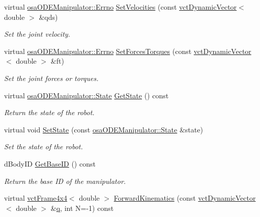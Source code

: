 \begin{DoxyCompactItemize}
virtual \hyperlink{classrob_manipulator_a7bbb51cdb81c9c681075a9274ca0cdc0}{osa\+O\+D\+E\+Manipulator\+::\+Errno} \hyperlink{classosa_o_d_e_manipulator_a07ba1e375b9382c8cf2c64af1443b89c}{Set\+Velocities} (const \hyperlink{classvct_dynamic_vector}{vct\+Dynamic\+Vector}$<$ double $>$ \&qds)
\begin{DoxyCompactList}\small\item\em Set the joint velocity. \end{DoxyCompactList}\item 
virtual \hyperlink{classrob_manipulator_a7bbb51cdb81c9c681075a9274ca0cdc0}{osa\+O\+D\+E\+Manipulator\+::\+Errno} \hyperlink{classosa_o_d_e_manipulator_ab7ed549d20e7fabb9c4a4331cc5db15c}{Set\+Forces\+Torques} (const \hyperlink{classvct_dynamic_vector}{vct\+Dynamic\+Vector}$<$ double $>$ \&ft)
\begin{DoxyCompactList}\small\item\em Set the joint forces or torques. \end{DoxyCompactList}\item 
virtual \hyperlink{classosa_o_d_e_manipulator_a56c8457aa6c0240b62580dcfce383ed2}{osa\+O\+D\+E\+Manipulator\+::\+State} \hyperlink{classosa_o_d_e_manipulator_a1e1c3b429b4a872f72c728b58633435c}{Get\+State} () const 
\begin{DoxyCompactList}\small\item\em Return the state of the robot. \end{DoxyCompactList}\item 
virtual void \hyperlink{classosa_o_d_e_manipulator_a721bf18eff3cc6f50d6b1d750141403a}{Set\+State} (const \hyperlink{classosa_o_d_e_manipulator_a56c8457aa6c0240b62580dcfce383ed2}{osa\+O\+D\+E\+Manipulator\+::\+State} \&state)
\begin{DoxyCompactList}\small\item\em Set the state of the robot. \end{DoxyCompactList}\item 
d\+Body\+I\+D \hyperlink{classosa_o_d_e_manipulator_a58ae1c77ed73ffff8e5afe899b3645d6}{Get\+Base\+I\+D} () const 
\begin{DoxyCompactList}\small\item\em Return the base I\+D of the manipulator. \end{DoxyCompactList}\item 
virtual \hyperlink{classvct_frame4x4}{vct\+Frame4x4}$<$ double $>$ \hyperlink{classosa_o_d_e_manipulator_a4c8716edca99fed055a5516a250018ee}{Forward\+Kinematics} (const \hyperlink{classvct_dynamic_vector}{vct\+Dynamic\+Vector}$<$ double $>$ \&\hyperlink{classosa_o_s_g_manipulator_a834ce7263dace4d925133753522abaa3}{q}, int N=-\/1) const 

\end{DoxyCompactItemize}
